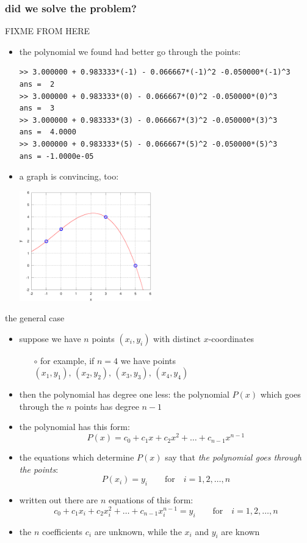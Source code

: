 \documentclass[10pt,hyperref]{beamer}
\begin{document}
\begin{frame}[fragile]
\frametitle{did we solve the problem?}

FIXME FROM HERE

\begin{itemize}
\item the polynomial we found had better go through the points:
\begin{Verbatim}[frame=single,fontfamily=courier,fontsize=\scriptsize]
>> 3.000000 + 0.983333*(-1) - 0.066667*(-1)^2 -0.050000*(-1)^3
ans =  2
>> 3.000000 + 0.983333*(0) - 0.066667*(0)^2 -0.050000*(0)^3
ans =  3
>> 3.000000 + 0.983333*(3) - 0.066667*(3)^2 -0.050000*(3)^3
ans =  4.0000
>> 3.000000 + 0.983333*(5) - 0.066667*(5)^2 -0.050000*(5)^3
ans = -1.0000e-05
\end{Verbatim}
\item a graph is convincing, too:
  \begin{center}
  \includegraphics[width=0.45\textwidth]{ex1solved}
  \end{center}
\end{itemize}
\end{frame}


\begin{frame}{the general case}

\begin{itemize}
\item suppose we have $n$ points $(x_i,y_i)$ with distinct $x$-coordinates
  \begin{itemize}
  \item[$\circ$]  for example, if $n=4$ we have points $(x_1,y_1),\,(x_2,y_2),\,(x_3,y_3),\,(x_4,y_4)$
  \end{itemize}
\item then the polynomial has degree one less:  the polynomial $P(x)$ which goes through the $n$ points has degree $n-1$
\item the polynomial has this form:
	$$P(x) = c_0 + c_1 x + c_2 x^2 + \dots + c_{n-1} x^{n-1}$$
\item the equations which determine $P(x)$ say that \emph{the polynomial goes through the points}:
	$$P(x_i) = y_i \qquad \text{for} \quad i=1,2,\dots,n$$
\item written out there are $n$ equations of this form:
	$$c_0 + c_1 x_i + c_2 x_i^2 + \dots + c_{n-1} x_i^{n-1} = y_i \qquad \text{for} \quad i=1,2,\dots,n$$
\item the $n$ coefficients $c_i$ are unknown, while the $x_i$ and $y_i$ are known
\end{itemize}
\end{frame}
\end{document}
